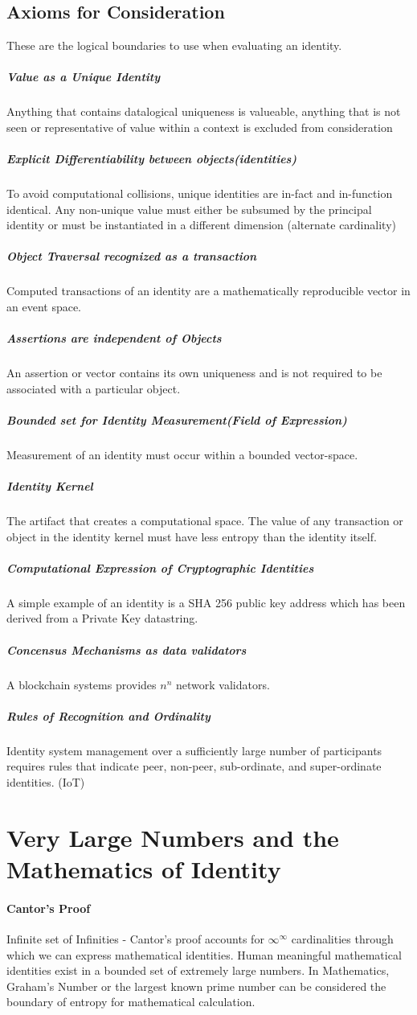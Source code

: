 \documentclass{article}
\begin{document}
		\subsection{Axioms for Consideration}These are the logical boundaries to use when evaluating an identity.
			\subparagraph{Value as a Unique Identity}
				Anything that contains datalogical uniqueness is valueable, anything that is not seen or representative of value within a context is excluded from consideration
			\subparagraph{Explicit Differentiability between objects(identities)}
				To avoid computational collisions, unique identities are in-fact and in-function identical.  Any non-unique value must either be subsumed by the principal identity or must be instantiated in a different dimension (alternate cardinality) 
			\subparagraph{Object Traversal recognized as a transaction}
				Computed transactions of an identity are a mathematically reproducible vector in an event space.
			\subparagraph{Assertions are independent of Objects}
				An assertion or vector contains its own uniqueness and is not required to be associated with a particular object.
			\subparagraph{Bounded set for Identity Measurement(Field of Expression)}
				Measurement of an identity must occur within a bounded vector-space.
			\subparagraph{Identity Kernel}
				The artifact that creates a computational space.  The value of any transaction or object in the identity kernel must have less entropy than the identity itself.
			\subparagraph{Computational Expression of Cryptographic Identities}
				A simple example of an identity is a SHA 256 public key address which has been derived from a Private Key datastring.
			\subparagraph{Concensus Mechanisms as data validators}
				A blockchain systems provides $n^n$ network validators.
			\subparagraph{Rules of Recognition and Ordinality}
				Identity system management over a sufficiently large number of participants requires rules that indicate peer, non-peer, sub-ordinate, and super-ordinate identities. (IoT)
			
\section{Very Large Numbers and the Mathematics of Identity}
		\paragraph{Cantor's Proof} Infinite set of Infinities - Cantor's proof accounts for $\infty^\infty$ cardinalities through which we can express mathematical identities.  Human meaningful mathematical identities exist in a bounded set of extremely large numbers.  In Mathematics, Graham's Number or the largest known prime number can be considered the boundary of entropy for mathematical calculation. 
\end{document}
